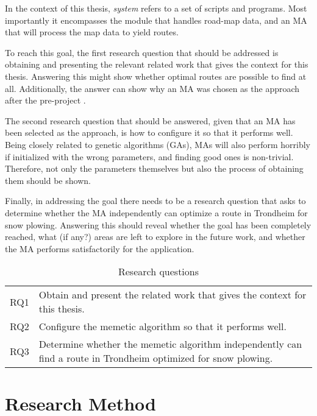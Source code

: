 In the context of this thesis, \emph{system} refers to a set of scripts and programs. Most importantly it encompasses the module that handles road-map data, and an MA that will process the map data to yield routes.

To reach this goal, the first research question that should be addressed is obtaining and presenting the relevant related work that gives the context for this thesis. Answering this might show whether optimal routes are possible to find at all. Additionally, the answer can show why an MA was chosen as the approach after the pre-project \citep{forprosjektet}.

The second research question that should be answered, given that an MA has been selected as the approach, is how to configure it so that it performs well. Being closely related to genetic algorithms (GAs), MAs will also perform horribly if initialized with the wrong parameters, and finding good ones is non-trivial. Therefore, not only the parameters themselves but also the process of obtaining them should be shown.

Finally, in addressing the goal there needs to be a research question that asks to determine whether the MA independently can optimize a route in Trondheim for snow plowing. Answering this should reveal whether the goal has been completely reached, what (if any?) areas are left to explore in the future work, and whether the MA performs satisfactorily for the application.

\begin{table}[H]
\centering
\begin{tabular}{cp{}}
RQ1  &  Obtain and present the related work that gives the context for this thesis. \\
RQ2  &  Configure the memetic algorithm so that it performs well.\\
RQ3  &  Determine whether the memetic algorithm independently can find a route in Trondheim optimized for snow plowing. \\
\end{tabular}
\caption{Research questions}
\label{tab:research_questions}
\end{table}

\section{Research Method}

